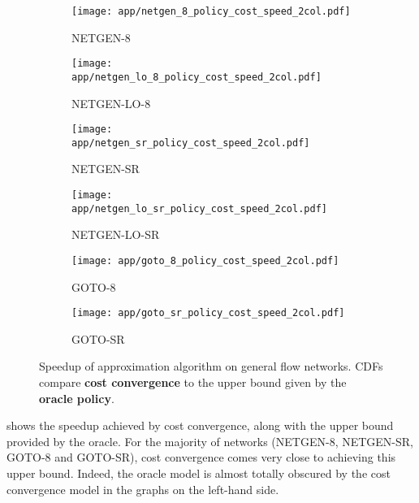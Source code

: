 \begin{figure}
    \begin{widepage}
        \begin{subfigure}[c]{0.5\textwidth}
            \texttt{[image: app/netgen\_8\_policy\_cost\_speed\_2col.pdf]}
            \caption{NETGEN-8}
        \end{subfigure}
        \begin{subfigure}[c]{0.5\textwidth}
            \texttt{[image: app/netgen\_lo\_8\_policy\_cost\_speed\_2col.pdf]}
            \caption{NETGEN-LO-8}
        \end{subfigure}
        \begin{subfigure}[c]{0.5\textwidth}
            \texttt{[image: app/netgen\_sr\_policy\_cost\_speed\_2col.pdf]}
            \caption{NETGEN-SR}
        \end{subfigure}
        \begin{subfigure}[c]{0.5\textwidth}
            \texttt{[image: app/netgen\_lo\_sr\_policy\_cost\_speed\_2col.pdf]}
            \caption{NETGEN-LO-SR}
        \end{subfigure}
        \begin{subfigure}[c]{0.5\textwidth}
            \texttt{[image: app/goto\_8\_policy\_cost\_speed\_2col.pdf]}
            \caption{GOTO-8}
        \end{subfigure}
        \begin{subfigure}[c]{0.5\textwidth}
            \texttt{[image: app/goto\_sr\_policy\_cost\_speed\_2col.pdf]}
            \caption{GOTO-SR}
        \end{subfigure}
    \end{widepage}
    \caption[Speedup of approximation algorithm on general flow networks]{Speedup of approximation algorithm on general flow networks. CDFs compare \textbf{\color{matplotlib_blue} cost convergence} to the upper bound given by the \textbf{\color{matplotlib_green} oracle policy}.}
    \label{fig:app-general-cost-speed-cdf}
\end{figure}

 shows the speedup achieved by cost convergence, along with the upper bound provided by the oracle. For the majority of networks (NETGEN-8, NETGEN-SR, GOTO-8 and GOTO-SR), cost convergence comes very close to achieving this upper bound. Indeed, the oracle model is almost totally obscured by the cost convergence model in the graphs on the left-hand side.

